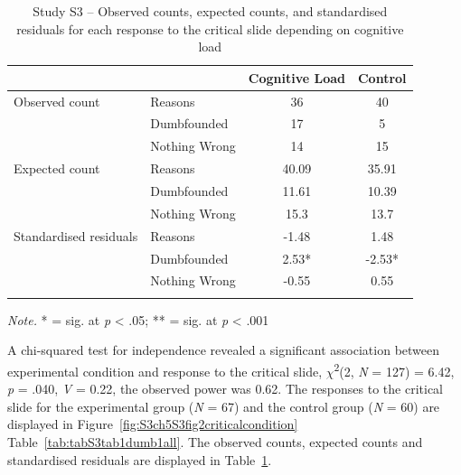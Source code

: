 \documentclass[
  man,floatsintext]{apa6}
\begin{document}
\begin{table}[tbp]

\begin{center}
\begin{threeparttable}

\caption{\label{tab:S3S3tab1dumb}Study S3 – Observed counts, expected counts, and standardised residuals for each response to the critical slide depending on cognitive load}

\begin{tabular}{llcc}
\toprule
 & \multicolumn{1}{c}{} & \multicolumn{1}{c}{Cognitive Load} & \multicolumn{1}{c}{Control}\\
\midrule
Observed count & Reasons & 36 & 40\\
 & Dumbfounded & 17 & 5\\
 & Nothing Wrong & 14 & 15\\
Expected count & Reasons & 40.09 & 35.91\\
 & Dumbfounded & 11.61 & 10.39\\
 & Nothing Wrong & 15.3 & 13.7\\
Standardised residuals & Reasons & -1.48 & 1.48\\
 & Dumbfounded & 2.53* & -2.53*\\
 & Nothing Wrong & -0.55 & 0.55\\
\bottomrule
\addlinespace
\end{tabular}

\begin{tablenotes}[para]
\normalsize{\textit{Note.} * = sig. at \emph{p} < .05; ** = sig. at \emph{p} < .001}
\end{tablenotes}

\end{threeparttable}
\end{center}

\end{table}

A chi-squared test for independence revealed a significant association between experimental condition and response to the critical slide, \(\chi\)\textsuperscript{2}(2, \emph{N} = 127) = 6.42, \emph{p} = .040, \emph{V} = 0.22, the observed power was 0.62. The responses to the critical slide for the experimental group (\emph{N} = 67) and the control group (\emph{N} = 60) are displayed in Figure~\ref{fig:S3ch5S3fig2criticalcondition} Table~\ref{tab:tabS3tab1dumb1all}. The observed counts, expected counts and standardised residuals are displayed in Table~\ref{tab:S3S3tab1dumb}.
\end{document}
